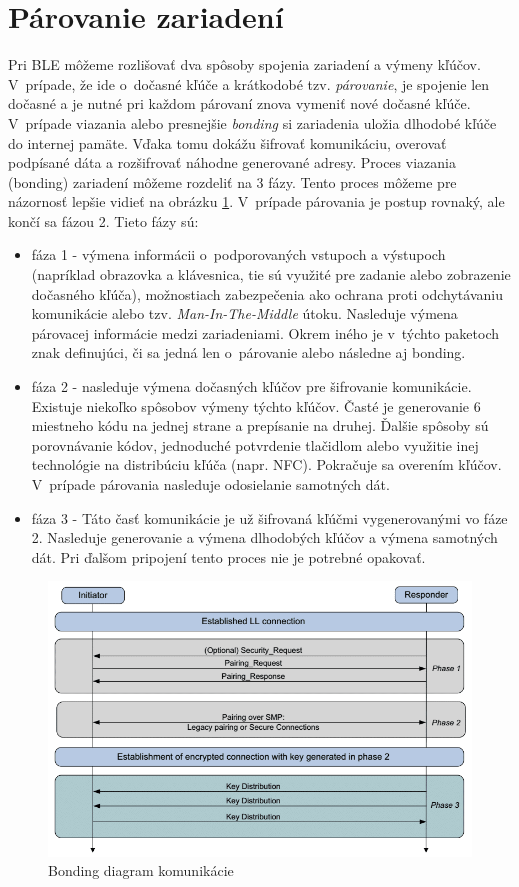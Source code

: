 \section{Párovanie zariadení}

Pri BLE môžeme rozlišovať dva spôsoby spojenia zariadení a výmeny kľúčov. V~prípade, že ide o~dočasné kľúče a krátkodobé tzv. \textit{párovanie}, je spojenie len dočasné a je nutné pri každom párovaní znova vymeniť nové dočasné kľúče. V~prípade viazania alebo presnejšie \textit{bonding} si zariadenia uložia dlhodobé kľúče do internej pamäte. Vďaka tomu dokážu šifrovať komunikáciu, overovať podpísané dáta a rozšifrovať náhodne generované adresy.
Proces viazania (bonding) zariadení môžeme rozdeliť na 3 fázy. Tento proces môžeme pre názornosť lepšie vidieť na obrázku \ref{fig:bonding}. V~prípade párovania je postup rovnaký, ale končí sa fázou 2. Tieto fázy sú:
\begin{itemize}
    \item fáza 1 - výmena informácii o~podporovaných vstupoch a výstupoch (napríklad obrazovka a klávesnica, tie sú využité pre zadanie alebo zobrazenie dočasného kľúča), možnostiach zabezpečenia ako ochrana proti odchytávaniu komunikácie alebo tzv. \textit{Man-In-The-Middle} útoku. Nasleduje výmena párovacej informácie medzi zariadeniami. Okrem iného je v~týchto paketoch znak definujúci, či sa jedná len o~párovanie alebo následne aj bonding.
    \item fáza 2 - nasleduje výmena dočasných kľúčov pre šifrovanie komunikácie. Existuje niekoľko spôsobov výmeny týchto kľúčov. Časté je generovanie 6 miestneho kódu na jednej strane a prepísanie na druhej. Ďalšie spôsoby sú porovnávanie kódov, jednoduché potvrdenie tlačidlom alebo využitie inej technológie na distribúciu kľúča (napr. NFC). Pokračuje sa overením kľúčov. V~prípade párovania nasleduje odosielanie samotných dát.
    \item fáza 3 - Táto časť komunikácie je už šifrovaná kľúčmi vygenerovanými vo fáze 2. Nasleduje generovanie a výmena dlhodobých kľúčov a výmena samotných dát. Pri ďalšom pripojení tento proces nie je potrebné opakovať.\cite{bluetooth}
\end{itemize}

\begin{figure}[ht]
    \centering
    \includegraphics[width=0.75\linewidth]{obrazky-figures/pairing-flowchart.png}
    \caption[Bonding diagram komunikácie]{Bonding diagram komunikácie\cite{bluetooth}}
    \label{fig:bonding}
\end{figure}



